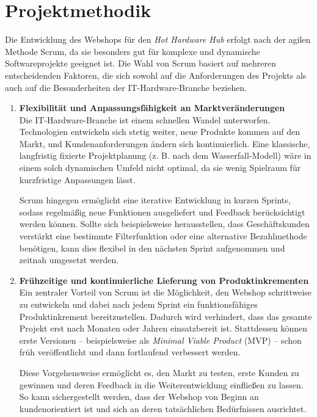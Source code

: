 \documentclass[%
	12pt,
	a4paper,
	oneside,
	parskip=full
]{scrbook}
\begin{document}
\section{Projektmethodik}
Die Entwicklung des Webshops für den \textit{Hot Hardware Hub} erfolgt nach der agilen Methode Scrum, da sie besonders gut für komplexe und dynamische Softwareprojekte geeignet ist. Die Wahl von Scrum basiert auf mehreren entscheidenden Faktoren, die sich sowohl auf die Anforderungen des Projekts als auch auf die Besonderheiten der IT-Hardware-Branche beziehen.

\begin{enumerate}
	\item \textbf{Flexibilität und Anpassungsfähigkeit an Marktveränderungen} \\
	Die IT-Hardware-Branche ist einem schnellen Wandel unterworfen. Technologien entwickeln sich stetig weiter, neue Produkte kommen auf den Markt, und Kundenanforderungen ändern sich kontinuierlich. Eine klassische, langfristig fixierte Projektplanung (z. B. nach dem Wasserfall-Modell) wäre in einem solch dynamischen Umfeld nicht optimal, da sie wenig Spielraum für kurzfristige Anpassungen lässt.
	
	Scrum hingegen ermöglicht eine iterative Entwicklung in kurzen Sprints, sodass regelmäßig neue Funktionen ausgeliefert und Feedback berücksichtigt werden können. Sollte sich beispielsweise herausstellen, dass Geschäftskunden verstärkt eine bestimmte Filterfunktion oder eine alternative Bezahlmethode benötigen, kann dies flexibel in den nächsten Sprint aufgenommen und zeitnah umgesetzt werden.
	
	\item \textbf{Frühzeitige und kontinuierliche Lieferung von Produktinkrementen} \\
	Ein zentraler Vorteil von Scrum ist die Möglichkeit, den Webshop schrittweise zu entwickeln und dabei nach jedem Sprint ein funktionsfähiges Produktinkrement bereitzustellen. Dadurch wird verhindert, dass das gesamte Projekt erst nach Monaten oder Jahren einsatzbereit ist. Stattdessen können erste Versionen – beispielsweise als \textit{Minimal Viable Product} (MVP) – schon früh veröffentlicht und dann fortlaufend verbessert werden.
	
	Diese Vorgehensweise ermöglicht es, den Markt zu testen, erste Kunden zu gewinnen und deren Feedback in die Weiterentwicklung einfließen zu lassen. So kann sichergestellt werden, dass der Webshop von Beginn an kundenorientiert ist und sich an deren tatsächlichen Bedürfnissen ausrichtet.
	

\end{enumerate}
\end{document}
